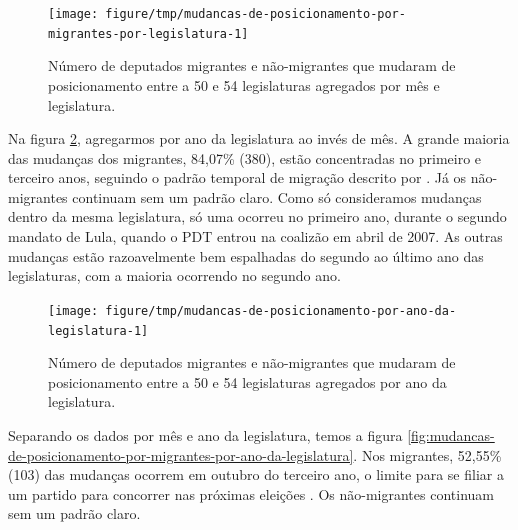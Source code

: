 \documentclass[a4paper,titlepage]{ppgi}\usepackage[]{graphicx}\usepackage[]{color}
\newenvironment{knitrout}{}{} %
\begin{document}
\begin{knitrout}
\color{fgcolor}\begin{figure}
\texttt{[image: figure/tmp/mudancas-de-posicionamento-por-migrantes-por-legislatura-1]} \caption[Número de deputados migrantes e não-migrantes que mudaram de posicionamento entre a 50\textordfeminine{} e 54\textordfeminine{} legislaturas agregados por mês e legislatura]{Número de deputados migrantes e não-migrantes que mudaram de posicionamento entre a 50\textordfeminine{} e 54\textordfeminine{} legislaturas agregados por mês e legislatura.}\label{fig:mudancas-de-posicionamento-por-migrantes-por-legislatura}
\end{figure}


\end{knitrout}

Na figura \ref{fig:mudancas-de-posicionamento-por-ano-da-legislatura},
agregarmos por ano da legislatura ao invés de mês. A grande maioria das
mudanças dos migrantes,
84,07\%
(380), estão concentradas no
primeiro e terceiro anos, seguindo o padrão temporal de migração descrito por
. Já os não-migrantes continuam sem um padrão claro.
Como só consideramos mudanças dentro da mesma legislatura, só uma ocorreu no
primeiro ano, durante o segundo mandato de Lula, quando o PDT entrou na
coalizão em abril de 2007. As outras mudanças estão razoavelmente bem
espalhadas do segundo ao último ano das legislaturas, com a maioria ocorrendo
no segundo ano.

\begin{knitrout}
\color{fgcolor}\begin{figure}
\texttt{[image: figure/tmp/mudancas-de-posicionamento-por-ano-da-legislatura-1]} \caption[Número de deputados migrantes e não-migrantes que mudaram de posicionamento entre a 50\textordfeminine{} e 54\textordfeminine{} legislaturas agregados por ano da legislatura]{Número de deputados migrantes e não-migrantes que mudaram de posicionamento entre a 50\textordfeminine{} e 54\textordfeminine{} legislaturas agregados por ano da legislatura.}\label{fig:mudancas-de-posicionamento-por-ano-da-legislatura}
\end{figure}


\end{knitrout}

Separando os dados por mês e ano da legislatura, temos a figura
\ref{fig:mudancas-de-posicionamento-por-migrantes-por-ano-da-legislatura}. Nos
migrantes,
52,55\%
(103) das mudanças ocorrem
em outubro do terceiro ano, o limite para se filiar a um partido para concorrer
nas próximas eleições \cite{Lei9504/1997}. Os não-migrantes continuam sem um
padrão claro.
\end{document}
